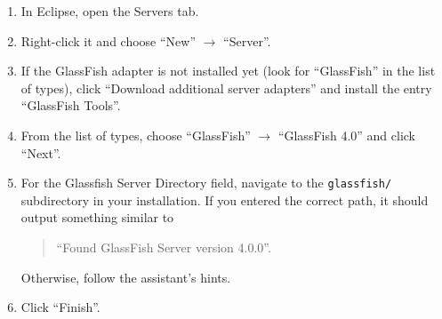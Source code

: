 \begin{enumerate}
\item In Eclipse, open the Servers tab.
\item Right-click it and choose \enquote{New} $\rightarrow$ \enquote{Server}.
\item If the GlassFish adapter is not installed yet (look for \enquote{GlassFish} in the list of types), click \enquote{Download additional server adapters} and install the entry \enquote{GlassFish Tools}.
\item From the list of types, choose \enquote{GlassFish} $\rightarrow$ \enquote{GlassFish 4.0} and click \enquote{Next}.
\item For the Glassfish Server Directory field, navigate to the \lstinline[language=Simple]|glassfish/| subdirectory in your installation. If you entered the correct path, it should output something similar to
	\begin{quotation}
	\enquote{Found GlassFish Server version 4.0.0}.
	\end{quotation}
	Otherwise, follow the assistant's hints.
\item Click \enquote{Finish}.

\end{enumerate}
